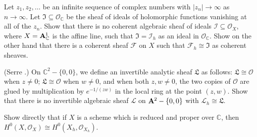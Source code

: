 {{\smallskip
\noindent\hypertarget{ex-B-6.2}{}Let $z_1,z_2,\ldots$ be an infinite sequence of complex numbers with $|z_n|\to\infty$ as $n\to\infty$. Let $\mathfrak I\subseteq\mathcal O_{\mathbb C}$ be the sheaf of ideals of holomorphic functions vanishing at all of the $z_n$. Show that there is no coherent algebraic sheaf of ideals $\mathcal I\subseteq\mathcal O_X$, where $X=\AffSpace{1}_{\mathbb C}$ is the affine line, such that $\mathfrak I=\mathcal I_h$ as an ideal in $\mathcal O_{\mathbb C}$. Show on the other hand that there is a coherent sheaf $\mathcal F$ on $X$ such that $\mathcal F_h\cong\mathfrak I$ as coherent sheaves.

\smallskip
\noindent\hypertarget{ex-B-6.3}{}(Serre .) On $\mathbb C^2-\{0,0\}$, we define an invertible analytic sheaf $\mathfrak L$ as follows: $\mathfrak L\cong\mathcal O$ when $z\ne0$; $\mathfrak L\cong\mathcal O$ when $w\ne0$, and when both $z,w\ne0$, the two copies of $\mathcal O$ are glued by multiplication by $e^{-1/(zw)}$ in the local ring at the point $(z,w)$. Show that there is no invertible algebraic sheaf $\mathcal L$ on $\AffSpace{2}-\{0,0\}$ with $\mathcal L_h\cong\mathfrak L$.

\smallskip
\noindent\hypertarget{ex-B-6.4}{}Show directly that if $X$ is a scheme which is reduced and proper over $\mathbb C$, then $H^0(X,\mathcal O_X)\cong H^0(X_h,\mathcal O_{X_h})$. \par}
}
